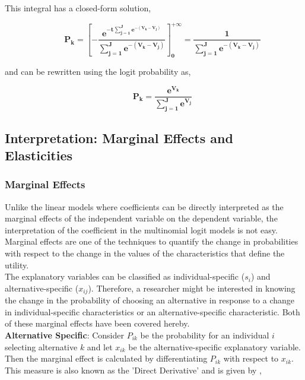 \documentclass[a4paper,11pt]{article}
\begin{document}
    This integral has a closed-form solution,

    \begin{equation*}
        \qquad \mathbf{P_{k} = \left[-\dfrac{e^{-t\sum_{j=1}^{J}e^{-\left(V_{k}-V_{j}\right)}}}{\sum_{j=1}^{J}e^{-\left(V_{k}-V_{j}\right)}}\right]_{0}^{+\infty} = \dfrac{1}{\sum_{j=1}^{J}e^{-\left(V_{k}-V_{j}\right)}}}
    \end{equation*}

    and can be rewritten using the logit probability as,

    \begin{equation*}
        \qquad \mathbf{P_{k} = \dfrac{e^{V_{k}}}{\sum_{j=1}^{J}e^{V_{j}}}}
    \end{equation*}

\subsection{Interpretation: Marginal Effects and Elasticities}
\label{subsec:Interpretation}

\subsubsection{Marginal Effects}
\label{subsubsec:Marginal Effects}

    Unlike the linear models where coefficients can be directly interpreted as the marginal effects of the independent variable on the dependent variable, the interpretation of the coefficient in the multinomial logit models is not easy. Marginal effects are one of the techniques to quantify the change in probabilities with respect to the change in the values of the characteristics that define the utility.\\

     The explanatory variables can be classified as individual-specific ($s_{i}$) and alternative-specific ($x_{ij}$). Therefore, a researcher might be interested in knowing the change in the probability of choosing an alternative in response to a change in individual-specific characteristics or an alternative-specific characteristic. Both of these marginal effects have been covered hereby.\\

    \textbf{Alternative Specific}: Consider $P_{ik}$ be the probability for an individual $i$ selecting alternative $k$ and let $x_{ik}$ be the alternative-specific explanatory variable. Then the marginal effect is calculated by differentiating $P_{ik}$ with respect to $x_{ik}$. This measure is also known as the 'Direct Derivative' and is given by \cite{Train},
\end{document}
